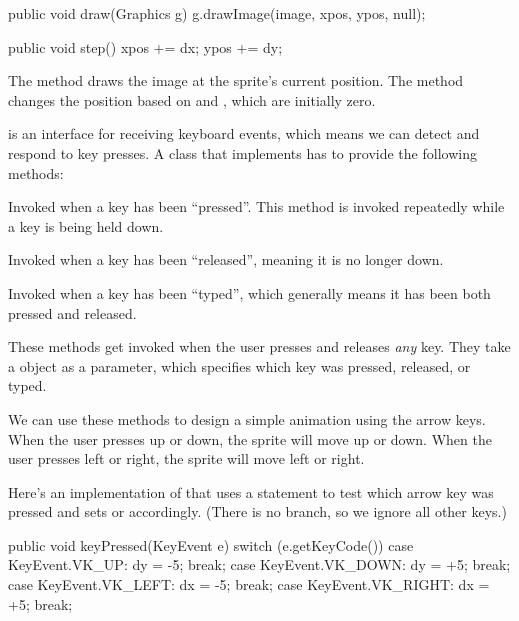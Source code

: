 \begin{code}
    public void draw(Graphics g) {
        g.drawImage(image, xpos, ypos, null);
    }

    public void step() {
        xpos += dx;
        ypos += dy;
    }
\end{code}

The  method draws the image at the sprite's current position.
The  method changes the position based on  and , which are initially zero.

 is an interface for receiving keyboard events, which means we can detect and respond to key presses.
A class that implements  has to provide the following methods:

\begin{description}

\item {}

Invoked when a key has been ``pressed''.
This method is invoked repeatedly while a key is being held down.

\item {}

Invoked when a key has been ``released'', meaning it is no longer down.

\item {}

Invoked when a key has been ``typed'', which generally means it has been both pressed and released.

\end{description}

These methods get invoked when the user presses and releases {\em any} key.
They take a  object as a parameter, which specifies which key was pressed, released, or typed.

We can use these methods to design a simple animation using the arrow keys.
When the user presses up or down, the sprite will move up or down.
When the user presses left or right, the sprite will move left or right.

Here's an implementation of  that uses a  statement to test which arrow key was pressed and sets  or  accordingly.
(There is no  branch, so we ignore all other keys.)

\begin{code}
public void keyPressed(KeyEvent e) {
    switch (e.getKeyCode()) {
        case KeyEvent.VK_UP:
            dy = -5;
            break;
        case KeyEvent.VK_DOWN:
            dy = +5;
            break;
        case KeyEvent.VK_LEFT:
            dx = -5;
            break;
        case KeyEvent.VK_RIGHT:
            dx = +5;
            break;
    }
}
\end{code}

